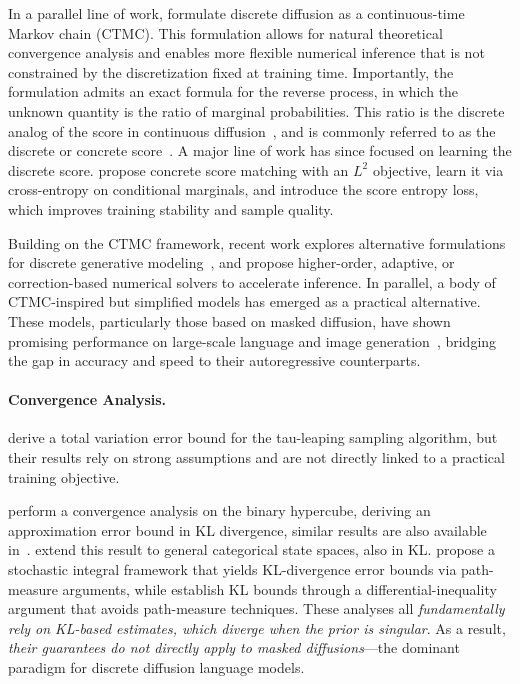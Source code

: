 \documentclass{article} %
\begin{document}
In a parallel line of work, \citet{campbell2022continuous} formulate discrete diffusion as a continuous-time Markov chain (CTMC). This formulation allows for natural theoretical convergence analysis and enables more flexible numerical inference that is not constrained by the discretization fixed at training time. Importantly, the formulation admits an exact formula for the reverse process, in which the unknown quantity is the ratio of marginal probabilities. This ratio is the discrete analog of the score in continuous diffusion~\citep{song2021scorebased}, and is commonly referred to as the discrete or concrete score~\citep{meng2022concrete}. A major line of work has since focused on learning the discrete score. \cite{meng2022concrete} propose concrete score matching with an $L^2$ objective, \cite{sun2023scorebased} learn it via cross-entropy on conditional marginals, and \citet{lou2024discrete} introduce the score entropy loss, which improves training stability and sample quality.

Building on the CTMC framework, recent work explores alternative formulations for discrete generative modeling~\citep{zhu2026mdns,li2026neural}, and \citet{park2025jump,zhao2026informed,ren2026fast,liang2026scores} propose higher-order, adaptive, or correction-based numerical solvers to accelerate inference. In parallel, a body of CTMC-inspired but simplified models has emerged as a practical alternative. These models, particularly those based on masked diffusion, have shown promising performance on large-scale language and image generation~\citep{chang2022maskgit,chang2023muse,shi2024simplified,sahoo2024simple,zheng2025masked,kim2025train,kim2026stop,nie2026large,xu2026scheduling,zhang2026masked}, bridging the gap in accuracy and speed to their autoregressive counterparts.

\paragraph{Convergence Analysis.} 
\citet{campbell2022continuous} derive a total variation error bound for the tau-leaping sampling algorithm, but their results rely on strong assumptions and are not directly linked to a practical training objective.

\citet{chen2025convergence} perform a convergence analysis on the binary hypercube, deriving an approximation error bound in KL divergence, similar results are also available in~\cite{le2025discrete}. \citet{zhang2025convergence} extend this result to general categorical state spaces, also in KL. \citet{ren2025discrete} propose a stochastic integral framework that yields KL-divergence error bounds via path-measure arguments, while \citet{liang2026discrete} establish KL bounds through a differential-inequality argument that avoids path-measure techniques. These analyses all \emph{fundamentally rely on KL-based estimates, which diverge when the prior is singular}. As a result, \emph{their guarantees do not directly apply to masked diffusions}---the dominant paradigm for discrete diffusion language models.
\end{document}
